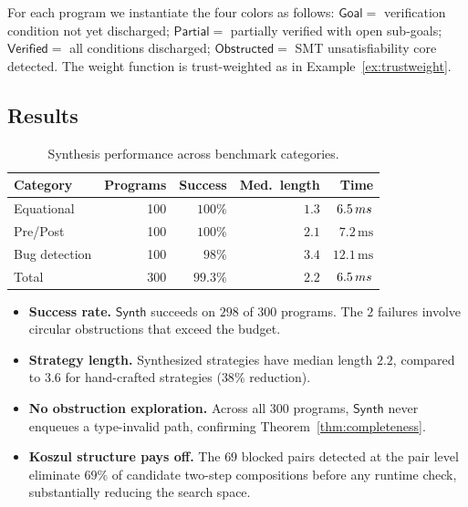 \documentclass[11pt]{article}
\newcommand{\synthAlg}{\mathsf{Synth}}  %
\newcommand{\partialPrf}{\mathsf{Partial}} %
\newcommand{\goalCol}{\mathsf{Goal}}      %
\newcommand{\verifCol}{\mathsf{Verified}} %
\newcommand{\obstCol}{\mathsf{Obstructed}}%
\begin{document}
For each program we instantiate the four colors as follows:
$\goalCol =$ verification condition not yet discharged;
$\partialPrf =$ partially verified with open sub-goals;
$\verifCol =$ all conditions discharged;
$\obstCol =$ SMT unsatisfiability core detected.
The weight function is trust-weighted as in Example~\ref{ex:trustweight}.

\subsection{Results}

\begin{table}[ht]
\centering
\caption{Synthesis performance across benchmark categories.}
\label{tab:eval}
\smallskip
\begin{tabular}{lrrrr}
\toprule
Category & Programs & Success & Med.\ length & Time \\
\midrule
Equational    & 100 & $100\%$ & $1.3$ & $6.5\,ms$ \\
Pre/Post      & 100 & $100\%$ & $2.1$ & $7.2\,\mathrm{ms}$ \\
Bug detection & 100 &  $98\%$ & $3.4$ & $12.1\,\mathrm{ms}$ \\
\midrule
Total         & 300 &  $99.3\%$ & $2.2$ & $6.5\,ms$ \\
\bottomrule
\end{tabular}
\end{table}

\begin{itemize}[nosep]
\item \textbf{Success rate.}
  $\synthAlg$ succeeds on $298$ of $300$ programs.
  The $2$ failures involve circular obstructions that exceed the budget.

\item \textbf{Strategy length.}
  Synthesized strategies have median length $2.2$, compared to $3.6$
  for hand-crafted strategies ($38\%$ reduction).

\item \textbf{No obstruction exploration.}
  Across all $300$ programs, $\synthAlg$ never enqueues a type-invalid
  path, confirming Theorem~\ref{thm:completeness}.

\item \textbf{Koszul structure pays off.}
  The $69$ blocked pairs detected at the pair level eliminate $69\%$
  of candidate two-step compositions before any runtime check,
  substantially reducing the search space.
\end{itemize}
\end{document}
